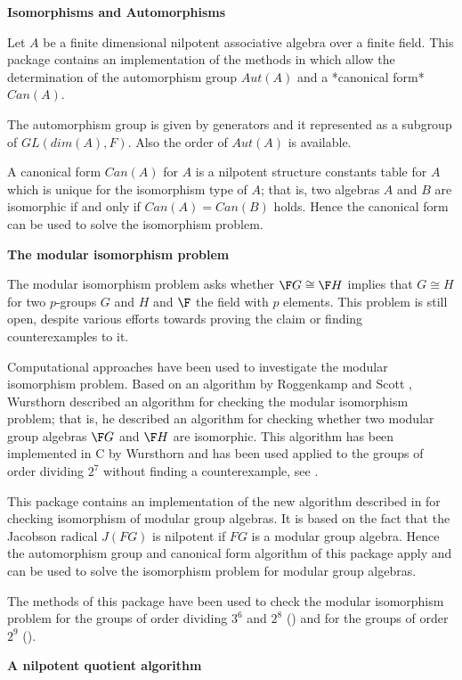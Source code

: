 {\bf Isomorphisms and Automorphisms}

Let $A$ be a finite dimensional nilpotent associative algebra over a 
finite field. This package contains an implementation of the methods 
in \cite{Eic07} which allow the determination of the automorphism group 
$Aut(A)$ and a *canonical form* $Can(A)$. 

The automorphism group is given by generators and it represented as a
subgroup of $GL(dim(A), F)$. Also the order of $Aut(A)$ is available.

A canonical form $Can(A)$ for $A$ is a nilpotent structure constants 
table for $A$ which is unique for the isomorphism type of $A$; 
that is, two algebras $A$ and $B$ are isomorphic if and only if $Can(A) 
= Can(B)$ holds. Hence the canonical form can be used to solve the 
isomorphism problem. 
\medskip

{\bf The modular isomorphism problem}

The modular isomorphism problem asks whether $\F G \cong \F H$ implies
that $G \cong H$ for two $p$-groups $G$ and $H$ and $\F$ the field with $p$
elements. This problem is still open, despite various efforts towards
proving the claim or finding counterexamples to it. 

Computational approaches have been used to investigate the modular isomorphism
problem. Based on an algorithm by Roggenkamp and Scott \cite{RS93}, Wursthorn
\cite{Wur93} described an algorithm for checking the modular isomorphism
problem; that is, he described an algorithm for checking whether two modular
group algebras $\F G$ and $\F H$ are isomorphic. This algorithm has been
implemented in C by Wursthorn and has been used applied to the groups of
order dividing $2^7$ without finding a counterexample, see \cite{BKRW99}.
\medskip

This package contains an implementation of the new algorithm described in
\cite{Eic07} for checking isomorphism of modular group algebras. It is based
on the fact that the Jacobson radical $J(FG)$ is nilpotent if $FG$ is a 
modular group algebra. Hence the automorphism group and canonical form 
algorithm of this package apply and can be used to solve the isomorphism
problem for modular group algebras.

The methods of this package have been used to check the modular isomorphism
problem for the groups of order dividing $3^6$ and $2^8$ (\cite{Eic07}) and
for the groups of order $2^9$ (\cite{EKo11}).
\medskip

{\bf A nilpotent quotient algorithm}

